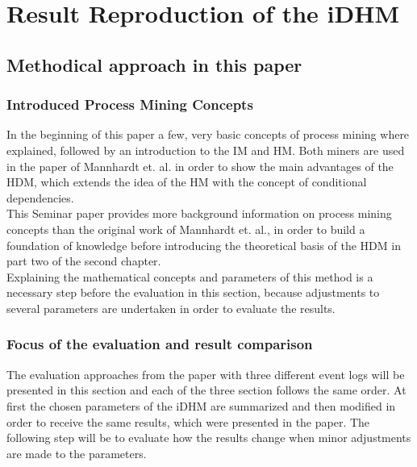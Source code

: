 
\chapter{Result Reproduction of the iDHM} %

\label{Chapter3} %





\section{Methodical approach in this paper}
\subsection{Introduced Process Mining Concepts}
In the beginning of this paper a few, very basic concepts of process mining where explained, followed by an introduction to the IM and HM.
Both miners are used in the paper of Mannhardt et. al. in order to show the main advantages of the HDM, which extends the idea of the HM with the concept of conditional dependencies.\\
This Seminar paper provides more background information on process mining concepts than the original work of Mannhardt et. al., in order to build a foundation of knowledge before introducing the theoretical basis of the HDM in part two of the second chapter.\\
Explaining the mathematical concepts and parameters of this method is a necessary step before the evaluation in this section, because adjustments to several parameters are undertaken in order to evaluate the results.

\subsection{Focus of the evaluation and result comparison}
The evaluation approaches from the paper with three different event logs will be presented in this section and each of the three section follows the same order. 
At first the chosen parameters of the iDHM are summarized and then modified in order to receive the same results, which were presented in the paper. The following step will be to evaluate how the results change when minor adjustments are made to the parameters.\\

